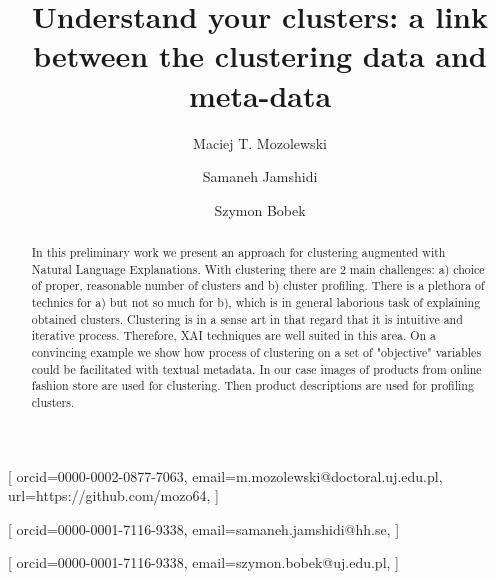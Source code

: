 \documentclass[
 twocolumn,
]{ceurart}
\begin{document}


\title{Understand your clusters: a link between the clustering data and meta-data}

\tnotemark[1]

\author[1]{Maciej T. Mozolewski}[%
orcid=0000-0002-0877-7063,
email=m.mozolewski@doctoral.uj.edu.pl,
url=https://github.com/mozo64,
]
\cormark[1]
\fnmark[1]
\address[1]{Jagiellonian University,
  Cracow, Poland}

\author[2]{Samaneh Jamshidi}[%
  orcid=0000-0001-7116-9338,
  email=samaneh.jamshidi@hh.se,
]
\fnmark[1]
\address[2]{Center for Applied Intelligent Systems Research (CAISR), Halmstad University Halmstad, Sweden}

\author[1]{Szymon Bobek}[%
orcid=0000-0001-7116-9338,
email=szymon.bobek@uj.edu.pl,
]
\fnmark[1]


\begin{abstract}
  In this preliminary work we present an approach for clustering augmented with Natural Language Explanations.
  With clustering there are 2 main challenges: a) choice of proper, reasonable number of clusters and b) cluster profiling.
  There is a plethora of technics for a) but not so much for b), which is in general laborious task of explaining obtained clusters.
  Clustering is in a sense art in that regard that it is intuitive and iterative process.
  Therefore, XAI techniques are well suited in this area.
  On a convincing example we show how process of clustering on a set of "objective" variables could be facilitated with textual metadata.
  In our case images of products from online fashion store are used for clustering.
  Then product descriptions are used for profiling clusters.
\end{abstract}
\end{document}
